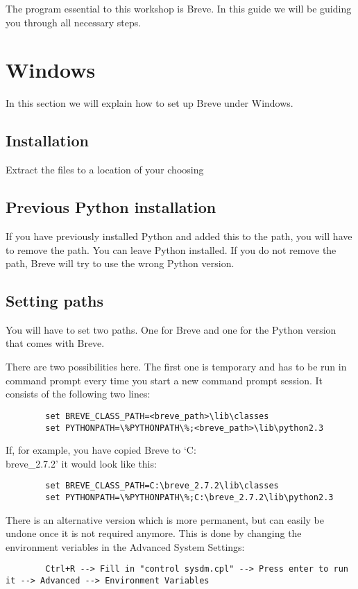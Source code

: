 The program essential to this workshop is Breve. In this guide we will be guiding you through all necessary steps. 

\section{Windows}
	In this section we will explain how to set up Breve under Windows.

\subsection{Installation}
	Extract the files to a location of your choosing

\subsection{Previous Python installation}
	If you have previously installed Python and added this to the path, you will have to remove the path. You can leave Python installed. If you do not remove the path, Breve will try to use the wrong Python version.

\subsection{Setting paths}
	You will have to set two paths. One for Breve and one for the Python version that comes with Breve.

	There are two possibilities here. The first one is temporary and has to be run in command prompt every time you start a new command prompt session. It consists of the following two lines:
	\begin{lstlisting}
		set BREVE_CLASS_PATH=<breve_path>\lib\classes
		set PYTHONPATH=\%PYTHONPATH\%;<breve_path>\lib\python2.3
	\end{lstlisting}
	If, for example, you have copied Breve to `C:\\breve\_2.7.2' it would look like this:
	\begin{lstlisting}
		set BREVE_CLASS_PATH=C:\breve_2.7.2\lib\classes
		set PYTHONPATH=\%PYTHONPATH\%;C:\breve_2.7.2\lib\python2.3
	\end{lstlisting}

	There is an alternative version which is more permanent, but can easily be undone once it is not required anymore. This is done by changing the environment veriables in the Advanced System Settings:
	\begin{lstlisting}
		Ctrl+R --> Fill in "control sysdm.cpl" --> Press enter to run it --> Advanced --> Environment Variables
	\end{lstlisting}

